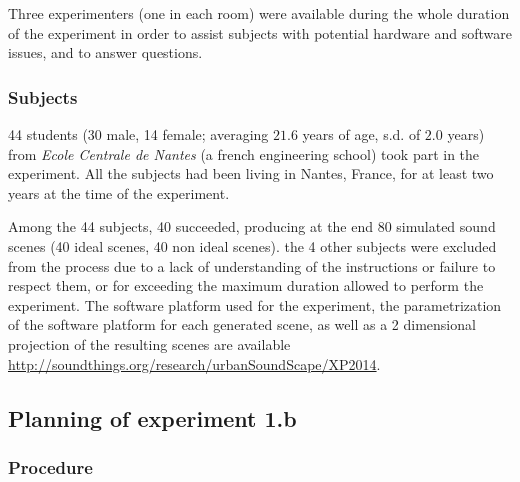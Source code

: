 \documentclass[12pt]{elsarticle}
\begin{document}

Three experimenters (one in each room) were available during the whole duration of the experiment in order to assist subjects with potential hardware and software issues, and to answer questions.

\subsubsection*{Subjects}


44 students (30 male, 14 female; averaging $21.6$ years of age, s.d. of $2.0$ years) from \emph{Ecole Centrale de Nantes} (a french engineering school) took part in the experiment. All the subjects had been living in Nantes, France, for at least two years at the time of the experiment.


Among the 44 subjects, 40 succeeded, producing at the end 80 simulated sound scenes (40 ideal scenes, 40 non ideal scenes). the 4 other subjects were excluded from the process due to a lack of understanding of the instructions or failure to respect them, or for exceeding the maximum duration allowed to perform the experiment.  The software platform used for the experiment, the parametrization of the software platform for each generated scene, as well as a 2 dimensional projection of the resulting scenes are available \url{http://soundthings.org/research/urbanSoundScape/XP2014}.

\subsection{Planning of experiment 1.b}
\label{sec:xp1b_plan}

\subsubsection*{Procedure}
\end{document}
